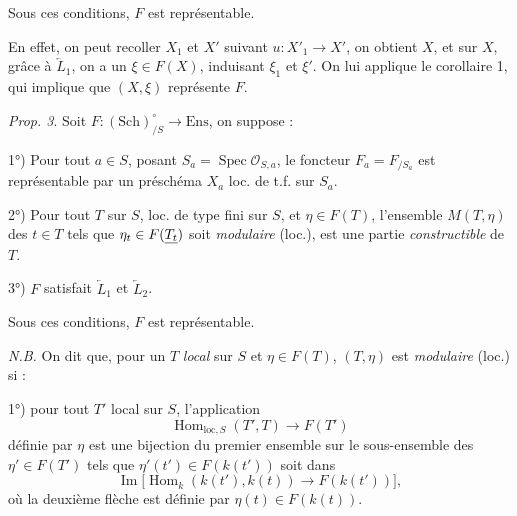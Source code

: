 \documentclass[11pt,a4paper]{article}
\begin{document}

Sous ces conditions, $F$ est représentable.

En effet, on peut recoller $X_1$ et $X'$ suivant $u : X'_1 \to X'$, on
obtient $X$, et sur $X$, grâce à $\underleftarrow{L}_1$, on a un
$\xi \in F(X)$, induisant $\xi_1$ et $\xi'$. On lui applique le
corollaire 1, qui implique que $(X, \xi)$ représente $F$.

\emph{Prop. 3}. Soit $F : (\mathrm{Sch})^{\circ}_{/S} \to \mathrm{Ens}$, on
suppose : \struck{\ill{}}

1°) Pour tout $a \in S$, posant
$S_a = \operatorname{Spec} \mathcal{O}_{S,a}$, le foncteur $F_a = F_{/S_a}$
est représentable par un préschéma $X_a$ loc. de t.f. sur $S_a$.

2°) Pour tout $T$ sur $S$, loc. de type fini sur $S$, et $\eta \in F(T)$,
l'ensemble $M(T, \eta)$ des $t \in T$ tels que
$\eta_t \in F(\uncertain{T_t})$ soit \emph{modulaire} (loc.), est une partie
\emph{constructible} de $T$.

3°) $F$ satisfait $\underleftarrow{L}_1$ et $\underleftarrow{L}_2$.

Sous ces conditions, $F$ est représentable.

\emph{N.B.} On dit que, pour un $T$ \emph{local} sur $S$ et
$\eta \in F(T)$, $(T, \eta)$ est \emph{modulaire} (loc.) si :

1°) pour tout $T'$ local sur $S$, l'application
\[
  \operatorname{Hom}_{\mathrm{loc}, S}(T', T) \longrightarrow F(T')
\]
définie par $\eta$ est une  bijection du premier
ensemble sur le sous-ensemble des $\eta' \in F(T')$ tels que
$\eta'(t') \in F(k(t'))$ soit dans
\[
  \operatorname{Im}\bigl[\operatorname{Hom}_k(k(t'), k(t))
  \longrightarrow F(k(t'))\bigr] ,
\]
où la deuxième flèche est définie par $\eta(t) \in F(k(t))$.
\end{document}
